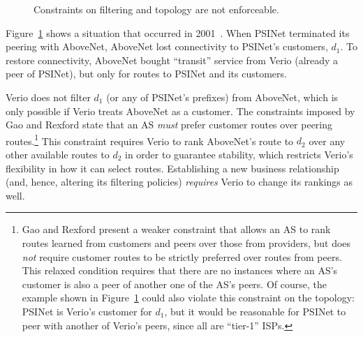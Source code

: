 
\begin{figure}
\centering
\begin{psfrags}
%
%
\end{psfrags}
\caption{Constraints on filtering and topology are not enforceable. }
\label{fig:depeer}
\end{figure}

\begin{example}
\label{ex:depeer}
Figure~\ref{fig:depeer} shows a situation that occurred 
in 2001~\cite{bush:privcomm}.  When PSINet terminated
its peering with AboveNet, AboveNet lost connectivity to
PSINet's customers, $d_1$.  To restore connectivity, AboveNet
bought ``transit'' service from Verio (already a peer of PSINet), but
only for routes to PSINet and its customers.

Verio does not filter $d_1$ (or any of PSINet's prefixes) from AboveNet,
which is only possible if Verio treats AboveNet as a customer.
The constraints imposed by Gao and
Rexford state that an AS {\em must} prefer customer routes over peering
routes.\footnote{Gao and Rexford present a weaker constraint that allows
an AS to rank routes learned from customers and peers over those from
providers, but does {\em not} require customer routes to be strictly
preferred over routes from peers.  This relaxed condition requires that
there are no instances where an AS's customer is also a peer of another
one of the AS's peers.  Of course, the example shown in
Figure~\ref{fig:depeer} could also 
violate this 
constraint on the topology: PSINet is Verio's customer for $d_1$, but it
would be reasonable for PSINet to peer with another of Verio's peers,
since all are ``tier-1'' ISPs.}  
%
%
This constraint requires Verio to rank AboveNet's route to $d_2$ over
any other available routes to $d_2$ in order to guarantee stability,
which restricts Verio's flexibility in how it can select
routes.
Establishing a new business
relationship (and, hence, altering its filtering policies) {\em requires} Verio
to change its rankings as well.
%
\end{example}



